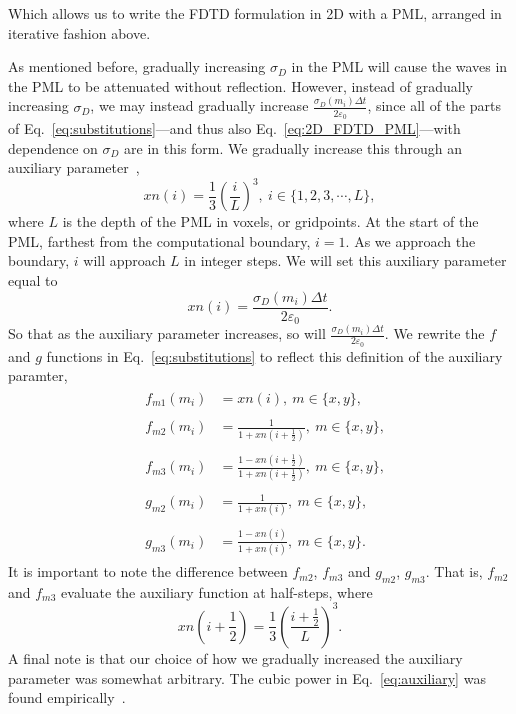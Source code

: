 \documentclass[12pt]{article}
\begin{document}
\begin{multicols}{2}
Which allows us to write the FDTD formulation in 2D with a PML, arranged in iterative fashion above.

As mentioned before, gradually increasing $\sigma_D$ in the PML will cause the waves in the PML to be attenuated without reflection. However, instead of gradually increasing $\sigma_D$, we may instead gradually increase $\frac{\sigma_D(m_i)\Delta t}{2\varepsilon_0}$, since all of the parts of Eq.~\ref{eq:substitutions}---and thus also Eq.~\ref{eq:2D_FDTD_PML}---with dependence on $\sigma_D$ are in this form. We gradually increase this through an auxiliary parameter~\cite{Sullivan00},
\begin{equation}
xn(i)=\frac{1}{3}\left(\frac{i}{L}\right)^3,~i\in\{1,2,3,\cdots,L\},
\end{equation}
where $L$ is the depth of the PML in voxels, or gridpoints. At the start of the PML, farthest from the computational boundary, $i=1$. As we approach the boundary, $i$ will approach $L$ in integer steps. We will set this auxiliary parameter equal to
\begin{equation}
\label{eq:auxiliary}
xn(i) = \frac{\sigma_D(m_i)\Delta t}{2\varepsilon_0}.
\end{equation}
So that as the auxiliary parameter increases, so will $\frac{\sigma_D(m_i)\Delta t}{2\varepsilon_0}$. We rewrite the $f$ and $g$ functions in Eq.~\ref{eq:substitutions} to reflect this definition of the auxiliary paramter,
\begin{subequations}
\begin{align}
&\begin{aligned}
f_{m1}(m_i) &= xn(i),~m\in\{x,y\},
\end{aligned}\\
&\begin{aligned}
f_{m2}(m_i) &= \frac{1}{1+xn\left(i+\frac{1}{2}\right)},~m\in\{x,y\},
\end{aligned}\\
&\begin{aligned}
f_{m3}(m_i) &= \frac{1-xn\left(i+\frac{1}{2}\right)}{1+xn\left(i+\frac{1}{2}\right)},~m\in\{x,y\},
\end{aligned}\\
&\begin{aligned}
g_{m2}(m_i) &= \frac{1}{1+xn\left(i\right)},~m\in\{x,y\},
\end{aligned}\\
&\begin{aligned}
g_{m3}(m_i) &= \frac{1-xn(i)}{1+xn(i)},~m\in\{x,y\}.
\end{aligned}
\end{align}
\end{subequations}
It is important to note the difference between $f_{m2}$, $f_{m3}$ and $g_{m2}$, $g_{m3}$. That is, $f_{m2}$ and $f_{m3}$ evaluate the auxiliary function at half-steps, where
\begin{equation}
xn\left(i+\frac{1}{2}\right) = \frac{1}{3}\left(\frac{i+\frac{1}{2}}{L}\right)^3.
\end{equation}
A final note is that our choice of how we gradually increased the auxiliary parameter was somewhat arbitrary. The cubic power in Eq.~\ref{eq:auxiliary} was found empirically~\cite{Sullivan00}.

\end{multicols}
\end{document}
